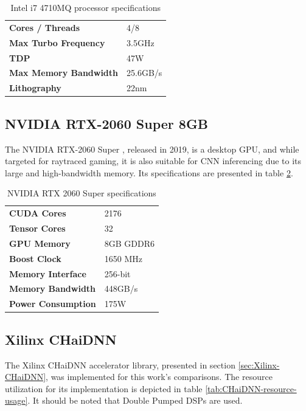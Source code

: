 \begin{table}[H]
	\caption{Intel i7 4710MQ processor specifications}
	\label{tab:Intel-i7-4710MQ-specs}
	\centering
	\begin{tabular}{ll}
		\toprule
		\textbf{Cores / Threads}      & 4/8      \\
		\textbf{Max Turbo Frequency}  & 3.5GHz   \\
		\textbf{TDP}                  & 47W      \\
		\textbf{Max Memory Bandwidth} & 25.6GB/s \\
		\textbf{Lithography}          & 22nm     \\
		\bottomrule
	\end{tabular}
\end{table}

\subsection{NVIDIA RTX-2060 Super 8GB}
The NVIDIA RTX-2060 Super \cite{NVIDIA-RTX-2060-Super}, released in 2019, is a desktop GPU, and while targeted for raytraced gaming, it is also suitable for CNN inferencing due to its large and high-bandwidth memory. Its specifications are presented in table \ref{tab:NVIDIA-RTX-2060-Super-specs}.

\begin{table}[H]
	\caption{NVIDIA RTX 2060 Super specifications}
	\label{tab:NVIDIA-RTX-2060-Super-specs}
	\centering
	\begin{tabular}{ll}
		\toprule
		\textbf{CUDA Cores}        & 2176      \\
		\textbf{Tensor Cores}      & 32        \\
		\textbf{GPU Memory}        & 8GB GDDR6 \\
		\textbf{Boost Clock}       & 1650 MHz  \\
		\textbf{Memory Interface}  & 256-bit   \\
		\textbf{Memory Bandwidth}  & 448GB/s   \\
		\textbf{Power Consumption} & 175W      \\
		\bottomrule
	\end{tabular}
\end{table}

\subsection{Xilinx CHaiDNN}
The Xilinx CHaiDNN accelerator library, presented in section \ref{sec:Xilinx-CHaiDNN}, was implemented for this work's comparisons. The resource utilization for its implementation is depicted in table \ref{tab:CHaiDNN-resource-usage}. It should be noted that Double Pumped DSPs are used.


